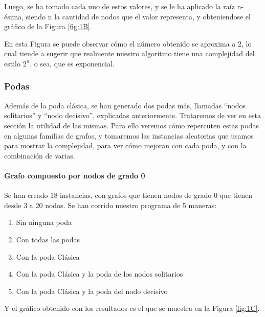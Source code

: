Luego, se ha tomado cada uno de estos valores, y se le ha aplicado la raíz n-ésima, siendo n la cantidad de nodos que el valor representa, y obteniendose el gráfico de la Figura \ref{fig:1B}.


En esta Figura se puede observar cómo el número obtenido se aproxima a $2$, lo cual tiende a sugerir que realmente nuestro algoritmo tiene una complejidad del estilo $2^n$, o sea, que es exponencial.


\subsubsection{Podas}

Además de la poda clásica, se han generado dos podas más, llamadas ``nodos solitarios'' y ``nodo decisivo'', explicadas anteriormente. Trataremos de ver en esta sección la utilidad de las mismas. Para ello veremos cómo repercuten estas podas en algunas familias de grafos, y tomaremos las instancias aleatorias que usamos para mostrar la complejidad, para ver cómo mejoran con cada poda, y con la combinación de varias.

\paragraph{Grafo compuesto por nodos de grado 0}

Se han creado 18 instancias, con grafos que tienen nodos de grado 0 que tienen desde 3 a 20 nodos. Se han corrido nuestro programa de 5 maneras:

\begin{enumerate}
	\item Sin ninguna poda
	\item Con todas las podas 
	\item Con la poda Clásica
	\item Con la poda Clásica y la poda de los nodos solitarios
	\item Con la poda Clásica y la poda del nodo decisivo
\end{enumerate}

Y el gráfico obtenido con los resultados es el que se muestra en la Figura \ref{fig:1C}.

